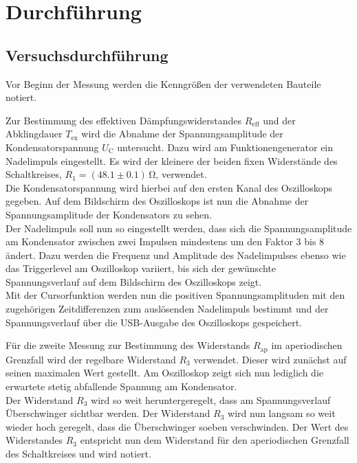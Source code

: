 \section{Durchführung}
\label{sec:Durchführung}



\subsection{Versuchsdurchführung}
\label{sec:Versuchsbeschreibung}

Vor Beginn der Messung werden die Kenngrößen der verwendeten Bauteile notiert.

Zur Bestimmung des effektiven Dämpfungswiderstandes $R_\text{eff}$ und der Abklingdauer $T_\text{ex}$ wird die Abnahme der Spannungsamplitude der Kondensatorspannung $U_\text{C}$ untersucht.
Dazu wird am Funktionengenerator ein Nadelimpuls eingestellt.
Es wird der kleinere der beiden fixen Widerstände des Schaltkreises, $R_\text{1}=(48.1 \pm 0.1)\,\si{\ohm}$, verwendet. \\
Die Kondensatorspannung wird hierbei auf den ersten Kanal des Oszilloskops gegeben.
Auf dem Bildschirm des Oszilloskops ist nun die Abnahme der Spannungsamplitude der Kondensators zu sehen.\\
Der Nadelimpuls soll nun so eingestellt werden, dass sich die Spannungsamplitude am Kondensator zwischen zwei Impulsen mindestens um den Faktor 3 bis 8 ändert.
Dazu werden die Frequenz und Amplitude des Nadelimpulses ebenso wie das Triggerlevel am Oszilloskop variiert, bis sich der gewünschte Spannungsverlauf auf dem Bildschirm des Oszilloskops zeigt.\\
Mit der Cursorfunktion werden nun die positiven Spannungsamplituden mit den zugehörigen Zeitdifferenzen zum auslösenden Nadelimpuls bestimmt und der Spannungsverlauf über die USB-Ausgabe des Oszilloskops gespeichert.


Für die zweite Messung zur Bestimmung des Widerstands $R_\text{ap}$ im aperiodischen Grenzfall wird der regelbare Widerstand $R_\text{3}$ verwendet.
Dieser wird zunächst auf seinen maximalen Wert gestellt. Am Oszilloskop zeigt sich nun lediglich die erwartete stetig abfallende Spannung am Kondensator. \\
Der Widerstand $R_\text{3}$ wird so weit heruntergeregelt, dass am Spannungsverlauf Überschwinger sichtbar werden.
Der Widerstand $R_\text{3}$ wird nun langsam so weit wieder hoch geregelt, dass die Überschwinger soeben verschwinden. Der Wert des Widerstandes $R_\text{3}$ entspricht nun dem Widerstand für den aperiodischen Grenzfall des Schaltkreises und wird notiert.

